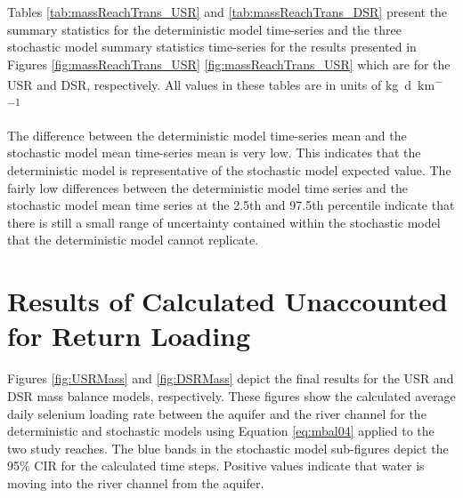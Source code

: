 \begin{linenumbers}
Tables \ref{tab:massReachTrans_USR} and \ref{tab:massReachTrans_DSR} present the summary statistics for the deterministic model time-series and the three stochastic model summary statistics time-series for the results presented in Figures \ref{fig:massReachTrans_USR} \ref{fig:massReachTrans_USR} which are for the USR and DSR, respectively.  All values in these tables are in units of \si{\kilo\gram\per\day\per\kilo\meter}

\subtabletop
\begin{table}[htbp]
	\centering
	\caption[USR deterministic and stochastic dissolved selenium mass transport time-series results tables.]{USR deterministic and stochastic dissolved selenium mass transport time-series results tables.  Values are in units of \si{\kilo\gram\per\day\per\kilo\meter}.}
	\label{tab:massReachTrans_USR}
	
	\tablevspace
\end{table}
\begin{table}[htbp]
	\centering
	\caption[USR deterministic and stochastic dissolved selenium mass transport time-series results tables.]{USR deterministic and stochastic dissolved selenium mass transport time-series results tables.  Values are in units of \si{\kilo\gram\per\day\per\kilo\meter}.}
	\label{tab:massReachTrans_DSR}
	
\end{table}

The difference between the deterministic model time-series mean and the stochastic model mean time-series mean is very low.  This indicates that the deterministic model is representative of the stochastic model expected value.  The fairly low differences between the deterministic model time series and the stochastic model mean time series at the 2.5th and 97.5th percentile indicate that there is still a small range of uncertainty contained within the stochastic model that the deterministic model cannot replicate.
\clearpage{}


\section{Results of Calculated Unaccounted for Return Loading}
\label{sec:MassModelResults}


Figures \ref{fig:USRMass} and \ref{fig:DSRMass} depict the final results for the USR and DSR mass balance models, respectively.  These figures show the calculated average daily selenium loading rate between the aquifer and the river channel for the deterministic and stochastic models using Equation \ref{eq:mbal04} applied to the two study reaches.  The blue bands in the stochastic model sub-figures depict the 95\% CIR for the calculated time steps.  Positive values indicate that water is moving into the river channel from the aquifer.


\end{linenumbers}
